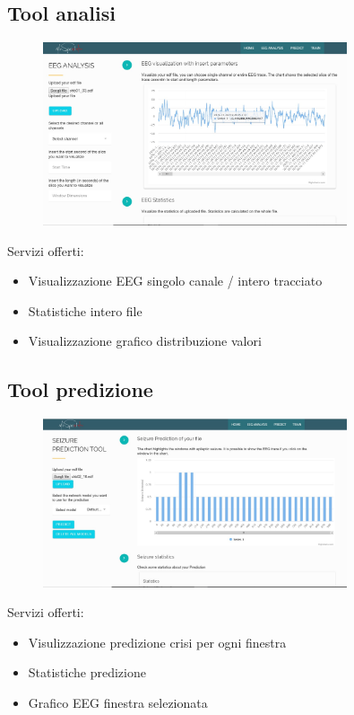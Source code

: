 \documentclass[xcolor=x11names,compress, 
]{beamer}
\theoremstyle{definition} \newtheorem{esempio}{Esempio}
\theoremstyle{definition}
\begin{document}
	\subsection{Tool analisi}
		\begin{frame}{\subsecname}
			\begin{figure}
				\includegraphics[width=0.8\textwidth]{immagini/analysis1}
			\end{figure}
			Servizi offerti:
			\begin{itemize}
				\item Visualizzazione EEG singolo canale / intero tracciato
				\item Statistiche intero file 
				\item Visualizzazione grafico distribuzione valori
			\end{itemize}
		\end{frame}
	
	\subsection{Tool predizione}
		\begin{frame}{\subsecname}
			\begin{figure}
				\includegraphics[width=0.8\textwidth]{immagini/prediction1}
			\end{figure}
			Servizi offerti:
			\begin{itemize}
				\item Visulizzazione predizione crisi per ogni finestra
				\item Statistiche predizione
				\item Grafico EEG finestra selezionata 
			\end{itemize}
		\end{frame}
	
\end{document}
